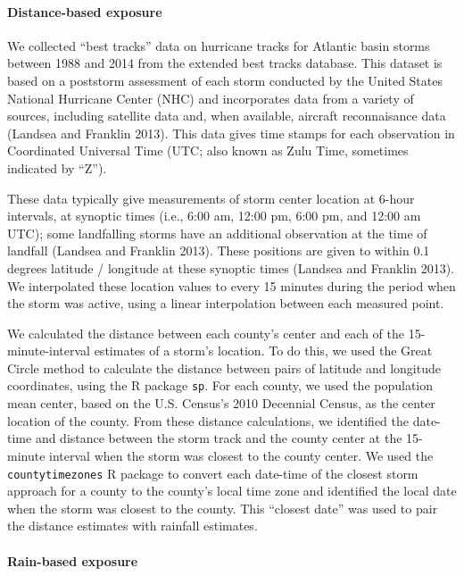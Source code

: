 \documentclass[]{elsarticle} %
\begin{document}
\paragraph{Distance-based exposure}\label{distance-based-exposure}

We collected ``best tracks'' data on hurricane tracks for Atlantic basin
storms between 1988 and 2014 from the extended best tracks database.
This dataset is based on a poststorm assessment of each storm conducted
by the United States National Hurricane Center (NHC) and incorporates
data from a variety of sources, including satellite data and, when
available, aircraft reconnaisance data (Landsea and Franklin 2013). This
data gives time stamps for each observation in Coordinated Universal
Time (UTC; also known as Zulu Time, sometimes indicated by ``Z'').

These data typically give measurements of storm center location at
6-hour intervals, at synoptic times (i.e., 6:00 am, 12:00 pm, 6:00 pm,
and 12:00 am UTC); some landfalling storms have an additional
observation at the time of landfall (Landsea and Franklin 2013). These
positions are given to within 0.1 degrees latitude / longitude at these
synoptic times (Landsea and Franklin 2013). We interpolated these
location values to every 15 minutes during the period when the storm was
active, using a linear interpolation between each measured point.

We calculated the distance between each county's center and each of the
15-minute-interval estimates of a storm's location. To do this, we used
the Great Circle method to calculate the distance between pairs of
latitude and longitude coordinates, using the R package \texttt{sp}. For
each county, we used the population mean center, based on the U.S.
Census's 2010 Decennial Census, as the center location of the county.
From these distance calculations, we identified the date-time and
distance between the storm track and the county center at the 15-minute
interval when the storm was closest to the county center. We used the
\texttt{countytimezones} R package to convert each date-time of the
closest storm approach for a county to the county's local time zone and
identified the local date when the storm was closest to the county. This
``closest date'' was used to pair the distance estimates with rainfall
estimates.

\paragraph{Rain-based exposure}\label{rain-based-exposure}
\end{document}
